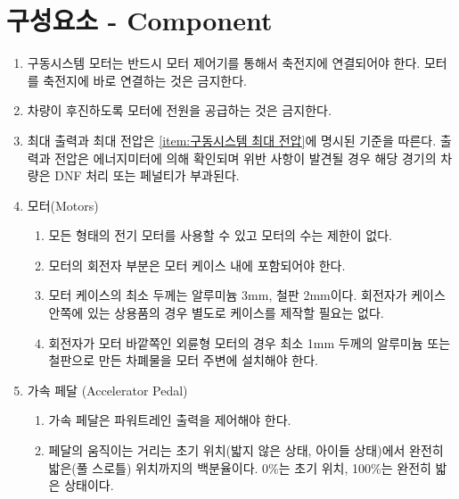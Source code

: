 \documentclass[final,a4paper,10pt]{report}
\begin{document}
\section{구성요소 - Component}\label{rule:formula-technical.components}
\begin{enumerate}
  \item\label{rule:formula-technical.components.motor-via-controller-only} 구동시스템 모터는 반드시 모터 제어기를 통해서 축전지에 연결되어야 한다. 모터를 축전지에 바로 연결하는 것은 금지한다.
  \item\label{rule:formula-technical.components.reverse-drive-banned} 차량이 후진하도록 모터에 전원을 공급하는 것은 금지한다.
  \item\label{rule:formula-technical.components.energy-meter-verification} 최대 출력과 최대 전압은 \ref{item:구동시스템 최대 전압}에 명시된 기준을 따른다. 출력과 전압은 에너지미터에 의해 확인되며 위반 사항이 발견될 경우 해당 경기의 차량은 DNF 처리 또는 페널티가 부과된다.

  \item\label{rule:formula-technical.components.motors} 모터(Motors)
    \begin{enumerate}
      \item\label{rule:formula-technical.components.motors.any-type-unlimited-count} 모든 형태의 전기 모터를 사용할 수 있고 모터의 수는 제한이 없다.
      \item\label{rule:formula-technical.components.motors.rotor-within-case} 모터의 회전자 부분은 모터 케이스 내에 포함되어야 한다.
      \item\label{rule:formula-technical.components.motors.min-case-thickness} 모터 케이스의 최소 두께는 알루미늄 3mm, 철판 2mm이다. 회전자가 케이스 안쪽에 있는 상용품의 경우 별도로 케이스를 제작할 필요는 없다.
      \item\label{rule:formula-technical.components.motors.outrunner-shield-1mm} 회전자가 모터 바깥쪽인 외륜형 모터의 경우 최소 1mm 두께의 알루미늄 또는 철판으로 만든 차폐물을 모터 주변에 설치해야 한다.
    \end{enumerate}

  \item\label{rule:formula-technical.components.accelerator-pedal} 가속 페달 (Accelerator Pedal) \label{item:가속 페달}
    \begin{enumerate}
      \item\label{rule:formula-technical.components.accelerator-pedal.controls-powertrain-output} 가속 페달은 파워트레인 출력을 제어해야 한다.
      \item\label{rule:formula-technical.components.accelerator-pedal.travel-percentage-scale} 페달의 움직이는 거리는 초기 위치(밟지 않은 상태, 아이들 상태)에서 완전히 밟은(풀 스로틀) 위치까지의 백분율이다. 0\%는 초기 위치, 100\%는 완전히 밟은 상태이다.


\end{enumerate}
\end{enumerate}
\end{document}
